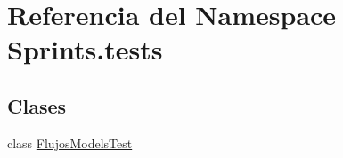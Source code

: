\hypertarget{namespace_sprints_1_1tests}{}\section{Referencia del Namespace Sprints.\+tests}
\label{namespace_sprints_1_1tests}
\subsection*{Clases}
\begin{DoxyCompactItemize}
\item 
class \hyperlink{class_sprints_1_1tests_1_1_flujos_models_test}{Flujos\+Models\+Test}
\end{DoxyCompactItemize}
